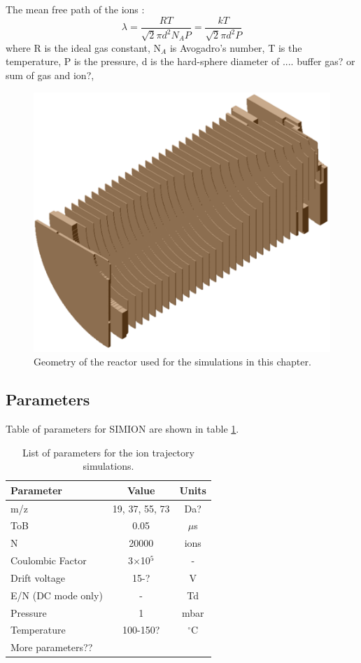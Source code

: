 The mean free path of the ions \cite{hirschfelder1954molecular}:
\begin{equation}
\label{eq:mfp}
\lambda = \frac{R T}{\sqrt{2} \pi d^2 N_A P} = \frac{k T}{\sqrt{2} \pi d^2 P}
\end{equation}
where R is the ideal gas constant, N$_A$ is Avogadro's number, T is the temperature, P is the pressure, d is the hard-sphere diameter of .... buffer gas? or sum of gas and ion?, 


\begin{figure}%
\centering
\includegraphics[width=0.7\linewidth]{pics/Reactor.PNG}
\centering
\caption{Geometry of the reactor used for the simulations in this chapter.}
\label{fig:sim_dt}
\end{figure}

\subsection{Parameters}

Table of parameters for SIMION are shown in table \ref{tb:sim}.

\begin{table}[ht]
\centering
\caption{List of parameters for the ion trajectory simulations.}
\label{tb:sim}
\begin{tabular}{lcc}
\toprule
\textbf{Parameter}	 &\textbf{Value}	&\textbf{Units} \quad\\ \midrule 
m/z           & 19, 37, 55, 73    	&Da?    				\\
ToB				& 	0.05				& $\mu$s\\
N				& 20000 			&ions \\
Coulombic Factor			&3$\times$10$^5$				&- \\
Drift voltage			&15-? 		&V \\
E/N (DC mode only)			&- 		&Td \\
Pressure			&1 				&mbar \\
Temperature			&100-150? 		&$^{\circ}$C \\
More parameters?? & & \\
\bottomrule
\end{tabular}
\end{table}

